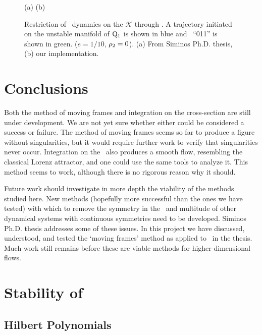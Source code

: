 \begin{figure}[ht]
\begin{center}
(a) %
(b) %
\end{center}
\caption[\CLe\ desymmetrization with transverse integration II]{
Restriction of \cLe\ dynamics on the {\slice} $\mathcal{K}$ through
. A trajectory initiated on the unstable
manifold of $\mathrm{Q}_{1}$ is shown in blue and \rpo\ ``011'' is shown
in green.
($e=1/10$, $\rho_2=0$).
(a) From Siminos Ph.D. thesis, (b) our
implementation.
    }
\label{fig:CLEtransvII}
\end{figure}

\section{Conclusions}

Both the method of moving frames and integration on the
cross-section are still under development. We are not yet
sure whether either could be considered a success or failure.
The method of moving frames seems so far to produce a figure
without singularities, but it would require further work to
verify that singularities never occur. Integration on the
\csection\ also produces a smooth flow, resembling the
classical Lorenz attractor, and one could use the same tools
to analyze it. This method seems to work, although there is
no rigorous reason why it should.

Future work should investigate in more depth the viability of
the methods studied here. New methods (hopefully more
successful than the ones we have tested) with which to remove
the symmetry in the \cLe\ and multitude of other dynamical
systems with continuous symmetries need to be developed.
Siminos Ph.D. thesis addresses some of
these issues. In this project we have discussed, understood,
and tested the `moving frames' method as applied to \cLe\ in
the thesis. Much work still remains before these are viable
methods for higher-dimensional flows.

\section{Stability of \Reqva}

\subsection{Hilbert Polynomials}

